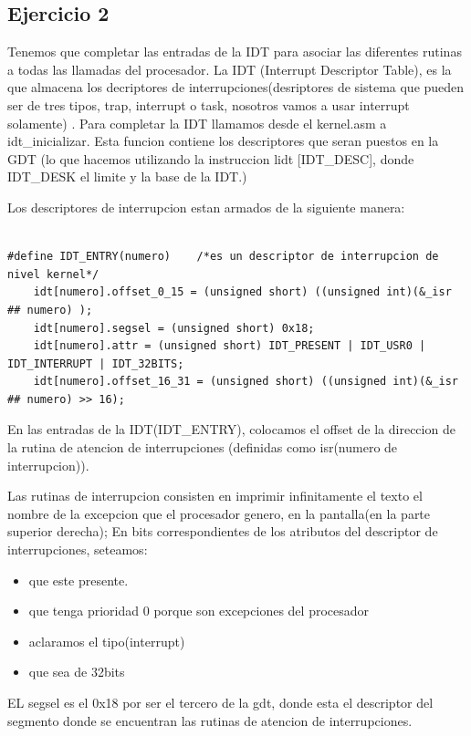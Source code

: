 \documentclass[a4paper]{article}
\newenvironment{codesnippet}{%
	\begin{Sbox}\begin{minipage}{\textwidth}\sffamily\small}%
	{\end{minipage}\end{Sbox}%
		\begin{center}%
		\vspace{-0.4cm}\colorbox{litegrey}{\TheSbox}\end{center}\vspace{0.3cm}}
\begin{document}
\subsection{Ejercicio 2}

	Tenemos que completar las entradas de la IDT para asociar las diferentes rutinas a todas las llamadas del procesador. La IDT (Interrupt Descriptor Table), es la que almacena los decriptores de interrupciones(desriptores de sistema que pueden ser de tres tipos, trap, interrupt o task, nosotros vamos a usar interrupt solamente)
.  	
	Para completar la IDT llamamos desde el kernel.asm a idt_inicializar.
	Esta funcion contiene los descriptores que seran puestos en la GDT (lo que hacemos utilizando la instruccion lidt [IDT_DESC], donde IDT_DESK el limite y la base de la IDT.)
	
	Los descriptores de interrupcion estan armados de la siguiente manera:
	
\begin{codesnippet}
\begin{verbatim}

#define IDT_ENTRY(numero)    /*es un descriptor de interrupcion de nivel kernel*/                                                                                    
    idt[numero].offset_0_15 = (unsigned short) ((unsigned int)(&_isr ## numero) );       
    idt[numero].segsel = (unsigned short) 0x18;                                                                 
    idt[numero].attr = (unsigned short) IDT_PRESENT | IDT_USR0 | IDT_INTERRUPT | IDT_32BITS;                                                                 
    idt[numero].offset_16_31 = (unsigned short) ((unsigned int)(&_isr ## numero) >> 16);

\end{verbatim}
\end{codesnippet}

	
	
	En las entradas de la IDT(IDT_ENTRY), colocamos el offset de la direccion de la rutina de atencion de interrupciones (definidas como isr(numero de interrupcion)).
	
	Las rutinas de interrupcion consisten en imprimir infinitamente el texto el nombre de  la excepcion que el procesador genero,  en la pantalla(en la parte superior derecha); En bits correspondientes de los atributos del descriptor de interrupciones, seteamos:
\begin{itemize}

\item	que este presente.
\item	que tenga  prioridad 0 porque son excepciones del procesador
\item	aclaramos el tipo(interrupt) 
\item	que sea de 32bits

\end{itemize}		
	EL segsel es el 0x18 por ser el tercero de la gdt, donde esta el descriptor del segmento donde se encuentran las rutinas de atencion de interrupciones.
	
\end{document}
